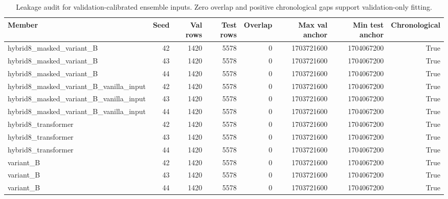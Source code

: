 \begin{table}
\caption{Leakage audit for validation-calibrated ensemble inputs. Zero overlap and positive chronological gaps support validation-only fitting.}
\label{tab:leakage_audit}
\begin{tabular}{lrrrrrrr}
\toprule
Member & Seed & Val rows & Test rows & Overlap & Max val anchor & Min test anchor & Chronological \\
\midrule
hybrid8\_masked\_variant\_B & 42 & 1420 & 5578 & 0 & 1703721600 & 1704067200 & True \\
hybrid8\_masked\_variant\_B & 43 & 1420 & 5578 & 0 & 1703721600 & 1704067200 & True \\
hybrid8\_masked\_variant\_B & 44 & 1420 & 5578 & 0 & 1703721600 & 1704067200 & True \\
hybrid8\_masked\_variant\_B\_vanilla\_input & 42 & 1420 & 5578 & 0 & 1703721600 & 1704067200 & True \\
hybrid8\_masked\_variant\_B\_vanilla\_input & 43 & 1420 & 5578 & 0 & 1703721600 & 1704067200 & True \\
hybrid8\_masked\_variant\_B\_vanilla\_input & 44 & 1420 & 5578 & 0 & 1703721600 & 1704067200 & True \\
hybrid8\_transformer & 42 & 1420 & 5578 & 0 & 1703721600 & 1704067200 & True \\
hybrid8\_transformer & 43 & 1420 & 5578 & 0 & 1703721600 & 1704067200 & True \\
hybrid8\_transformer & 44 & 1420 & 5578 & 0 & 1703721600 & 1704067200 & True \\
variant\_B & 42 & 1420 & 5578 & 0 & 1703721600 & 1704067200 & True \\
variant\_B & 43 & 1420 & 5578 & 0 & 1703721600 & 1704067200 & True \\
variant\_B & 44 & 1420 & 5578 & 0 & 1703721600 & 1704067200 & True \\
\bottomrule
\end{tabular}
\end{table}
